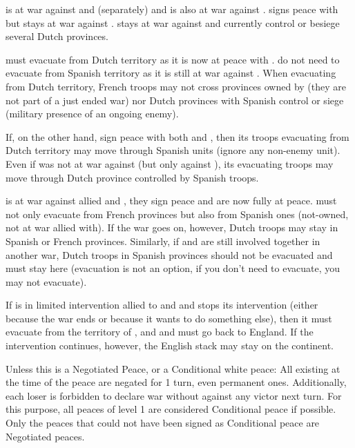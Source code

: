 \begin{exemple}
  \FRA is at war against \HIS and \HOL (separately) and \HIS is also at war
  against \HOL. \FRA signs peace with \HOL but stays at war against \HIS. \HIS
  stays at war against \HOL and currently control or besiege several Dutch
  provinces.

  \FRA must evacuate from Dutch territory as it is now at peace with
  \HOL. \FRA do not need to evacuate from Spanish territory as it is still at
  war against \HIS. When evacuating from Dutch territory, French troops may
  not cross provinces owned by \HIS (they are not part of a just ended war)
  nor Dutch provinces with Spanish control or siege (military presence of an
  ongoing enemy).

  If, on the other hand, \FRA sign peace with both \HIS and \HOL, then its
  troops evacuating from Dutch territory may move through Spanish units
  (ignore any non-enemy unit). Even if \FRA was not at war against \HIS (but
  only against \HOL), its evacuating troops may move through Dutch province
  controlled by Spanish troops.
\end{exemple}

\begin{exemple}[Alliance]
  \FRA is at war against allied \HIS and \HOL, they sign peace and are now
  fully at peace. \HOL must not only evacuate from French provinces but also
  from Spanish ones (not-owned, not at war allied with). If the war goes on,
  however, Dutch troops may stay in Spanish or French provinces. Similarly, if
  \HOL and \HIS are still involved together in another war, Dutch troops in
  Spanish provinces should not be evacuated and must stay here (evacuation is
  not an option, if you don't need to evacuate, you may not evacuate).

  If \ANG is in limited intervention allied to \HIS and \HOL and stops its
  intervention (either because the war ends or because it wants to do
  something else), then it must evacuate from the territory of \FRA, \HIS and
  \HOL and must go back to England. If the intervention continues, however,
  the English stack may stay on the continent.
\end{exemple}

\aparag[Pacification] Unless this is a Negotiated Peace, or a Conditional
white peace:
\bparag All existing \CB at the time of the peace are negated for 1 turn, even
permanent ones.
\bparag Additionally, each loser is forbidden to declare war without \CB
against any victor next turn.
\bparag For this purpose, all peaces of level 1 are considered Conditional
peace if possible. Only the peaces that could not have been signed as
Conditional peace are Negotiated peaces.

